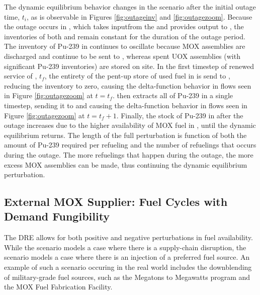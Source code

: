 The dynamic equilibrium behavior changes in the \outage scenario after the
initial outage time, $t_i$, as is observable in Figures \ref{fig:outageinv} and
\ref{fig:outagezoom}. Because the outage occurs in \separations, which takes
inputfrom the \reactors and provides output to \fabrication, the inventories of
both \separations and \fabrication remain constant for the duration of the
outage period. The inventory of Pu-239 in \reactors continues to oscillate
because MOX assemblies are discharged and continue to be sent to \storage,
whereas spent UOX assemblies (with significant Pu-239 inventories) are stored on
site. In the first timestep of renewed service of \separations, $t_f$, the
entirety of the pent-up store of used fuel in \reactors is send to \separations,
reducing the inventory to zero, causing the delta-function behavior in \reactor
flows seen in Figure \ref{fig:outagezoom} at $t = t_f$. \separations then
extracts all of Pu-239 in a single timestep, sending it to \fabrication and
causing the delta-function behavior in \separations flows seen in Figure
\ref{fig:outagezoom} at $t = t_f + 1$. Finally, the stock of Pu-239 in \reactors
after the outage increases due to the higher availability of MOX fuel in
\fabrication, until the dynamic equilibrium returns. The length of the full
perturbation is function of both the amount of Pu-239 required per refueling and
the number of refuelings that occurs during the outage. The more refuelings that
happen during the outage, the more excess MOX assemblies can be made, thus
continuing the dynamic equilibrium perturbation.

\subsection{External MOX Supplier: Fuel Cycles with Demand Fungibility}

The DRE allows for both positive and negative perturbations in fuel
availability. While the \outage scenario models a case where there is a
supply-chain disruption, the \external scenario models a case where
there is an injection of a preferred fuel source. An example of such a scenario
occuring in the real world includes the downblending of military-grade fuel
sources, such as the Megatons to Megawatts program and the MOX Fuel Fabrication
Facility.

